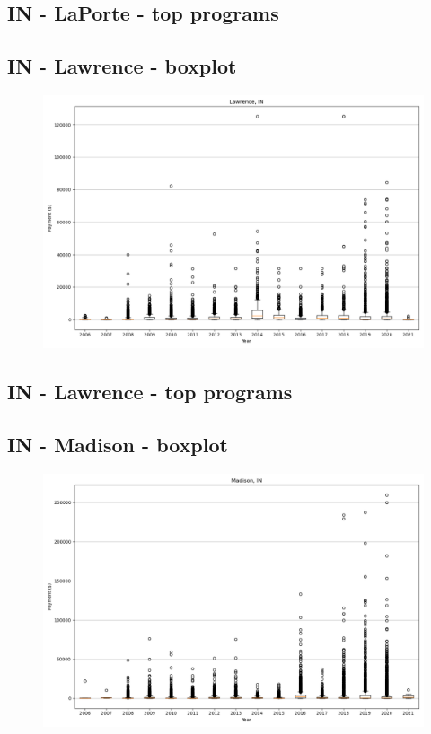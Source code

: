 \subsection*{IN - LaPorte - top programs}

\newpage
\subsection*{IN - Lawrence - boxplot}
\begin{figure}[h]
\centering
\includegraphics[width=7in]{../output/boxplots/counties/Lawrence-IN_boxplot.png}
\end{figure}


\subsection*{IN - Lawrence - top programs}

\newpage
\subsection*{IN - Madison - boxplot}
\begin{figure}[h]
\centering
\includegraphics[width=7in]{../output/boxplots/counties/Madison-IN_boxplot.png}
\end{figure}


